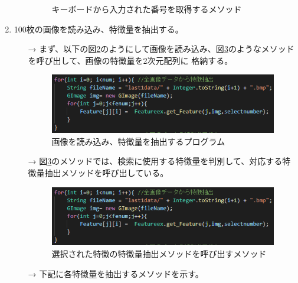 \begin{enumerate}
\begin{itemize}
\begin{figure}[htbp]
\begin{minipage}[t]{\hsize}
        \centering
        \caption{キーボードから入力された番号を取得するメソッド\cite{url2}}
        \label{graph:2}
      \end{minipage}
    \end{figure}
  \end{itemize}
  
  \item 100枚の画像を読み込み、特徴量を抽出する。
  \begin{itemize}
    \item[→] まず、以下の図\ref{graph:3}のようにして画像を読み込み、図\ref{graph:4}のようなメソッドを呼び出して、画像の特徴量を2次元配列に
    格納する。
    \begin{figure}[htbp]
      \begin{minipage}[t]{\hsize}
        \includegraphics[scale=0.4]{画像読み込み.PNG}
        \centering
        \caption{画像を読み込み、特徴量を抽出するプログラム}
        \label{graph:3}
      \end{minipage}
    \end{figure}
    \item[→] 図\ref{graph:4}のメソッドでは、検索に使用する特徴量を判別して、対応する特徴量抽出メソッドを呼び出している。
    \begin{figure}[htbp]
      \begin{minipage}[t]{\hsize}
        \includegraphics[scale=0.4]{画像読み込み.PNG}
        \centering
        \caption{選択された特徴の特徴量抽出メソッドを呼び出すメソッド}
        \label{graph:4}
      \end{minipage}
    \end{figure}
    \clearpage
    \item[→] 下記に各特徴量を抽出するメソッドを示す。
    \begin{itemize}

\end{itemize}
\end{itemize}
\end{enumerate}
